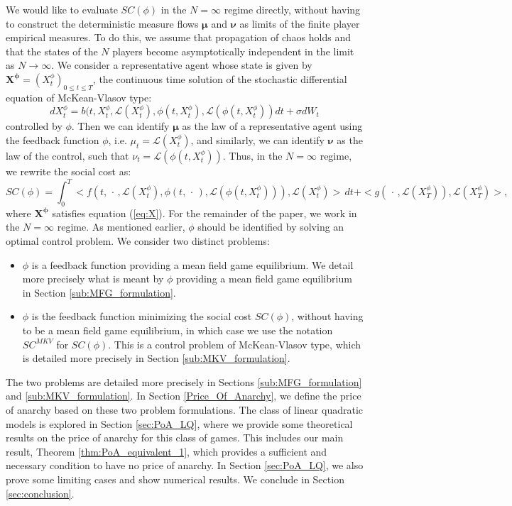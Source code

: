 \documentclass[11pt]{article}
\def\bmu{\boldsymbol{\mu}}
\def\bnu{\boldsymbol{\nu}}
\newcommand\cL{\mathcal L}
\begin{document}
We would like to evaluate $SC(\phi)$ in the $N=\infty$ regime directly, without having to construct the deterministic measure flows $\bmu$ and $\bnu$ as limits of the finite player empirical measures. To do this, we assume that propagation of chaos holds and that the states of the $N$ players become asymptotically independent in the limit as $N \rightarrow \infty$. We consider a representative agent whose state is given by $\boldsymbol{X^{\phi}}=(X^{\phi}_t)_{0 \leq t \leq T}$, the continuous time solution of the stochastic differential equation of McKean-Vlasov type:
\begin{equation}
    dX^{\phi}_t=b(t,X^{\phi}_t,\cL(X^{\phi}_t),\phi(t,X^{\phi}_t),\cL(\phi(t,X^{\phi}_t))dt+\sigma dW_t
\label{eq:X}
\end{equation}
controlled by $\phi$. Then we can identify $\bmu$ as the law of a representative agent using the feedback function $\phi$, i.e. $\mu_t=\cL(X^{\phi}_t)$, and similarly, we can identify $\bnu$ as the law of the control, such that $\nu_t=\cL(\phi(t,X^{\phi}_t))$. Thus, in the $N=\infty$ regime, we rewrite the social cost as:
\begin{equation*}
SC(\phi)=\int_0^T<f(t,\,\cdot\,,\cL(X^{\phi}_t),\phi(t,\,\cdot\,),\cL(\phi(t,X^{\phi}_t))),\cL(X^{\phi}_t)>\,dt+<g(\,\cdot\,,\cL(X^{\phi}_T)),\cL(X^{\phi}_T)>,
\end{equation*}
where $\boldsymbol{X^{\phi}}$ satisfies equation (\ref{eq:X}). For the remainder of the paper, we work in the $N=\infty$ regime. As mentioned earlier, $\phi$ should be identified by solving an optimal control problem. We consider two distinct problems:
\begin{itemize}\itemsep=-2pt
\item $\phi$ is a feedback function providing a mean field game equilibrium. We detail more precisely what is meant by $\phi$ providing a mean field game equilibrium in Section \ref{sub:MFG_formulation}.
\item $\phi$ is the feedback function minimizing the social cost $SC(\phi)$, without having to be a mean field game equilibrium, in which case we use the notation $SC^{MKV}$ for $SC(\phi)$. This is a control problem of McKean-Vlasov type, which is detailed more precisely in Section \ref{sub:MKV_formulation}.
\end{itemize}
The two problems are detailed more precisely in Sections \ref{sub:MFG_formulation} and \ref{sub:MKV_formulation}. In Section \ref{Price_Of_Anarchy}, we define the price of anarchy based on these two problem formulations. The class of linear quadratic models is explored in Section \ref{sec:PoA_LQ}, where we provide some theoretical results on the price of anarchy for this class of games. This includes our main result, Theorem \ref{thm:PoA_equivalent_1}, which provides a sufficient and necessary condition to have no price of anarchy. In Section \ref{sec:PoA_LQ}, we also prove some limiting cases and show numerical results. We conclude in Section \ref{sec:conclusion}.
\end{document}
